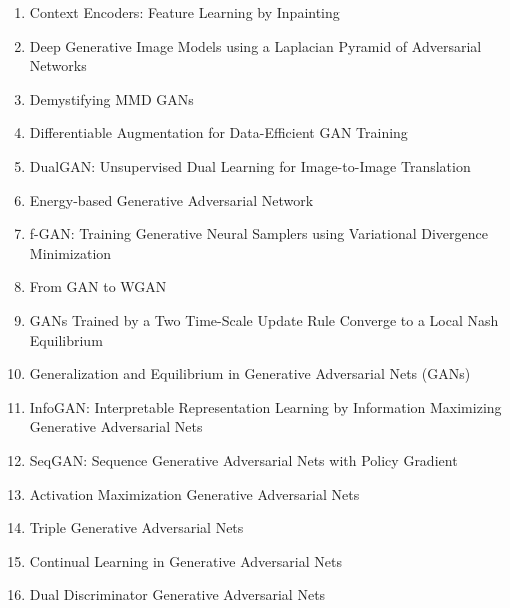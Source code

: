 \documentclass[acmlarge]{acmart}
\begin{document}
\begin{enumerate}
	\item Context Encoders: Feature Learning by Inpainting \cite{pathak2016context} 

	\item Deep Generative Image Models using a Laplacian Pyramid of Adversarial Networks \cite{denton2015deep} 

	\item Demystifying MMD GANs \cite{bikowski2018demystifying} 

	\item Differentiable Augmentation for Data-Efficient GAN Training \cite{zhao2020differentiable} 

	\item DualGAN: Unsupervised Dual Learning for Image-to-Image Translation \cite{yi2017dualgan} 

	\item Energy-based Generative Adversarial Network \cite{zhao2016energybased} 

	\item f-GAN: Training Generative Neural Samplers using Variational Divergence Minimization \cite{nowozin2016fgan} 

	\item From GAN to WGAN \cite{weng2019gan} 

	\item GANs Trained by a Two Time-Scale Update Rule Converge to a Local Nash Equilibrium \cite{heusel2017gans} 

	\item Generalization and Equilibrium in Generative Adversarial Nets (GANs) \cite{arora2017generalization} 

	\item InfoGAN: Interpretable Representation Learning by Information Maximizing Generative Adversarial Nets \cite{chen2016infogan} 

	\item SeqGAN: Sequence Generative Adversarial Nets with Policy Gradient \cite{yu2016seqgan} 

	\item Activation Maximization Generative Adversarial Nets \cite{zhou2017activation} 

	\item Triple Generative Adversarial Nets \cite{li2017triple} 

	\item Continual Learning in Generative Adversarial Nets \cite{seff2017continual} 

	\item Dual Discriminator Generative Adversarial Nets \cite{nguyen2017dual} 


\end{enumerate}
\end{document}
